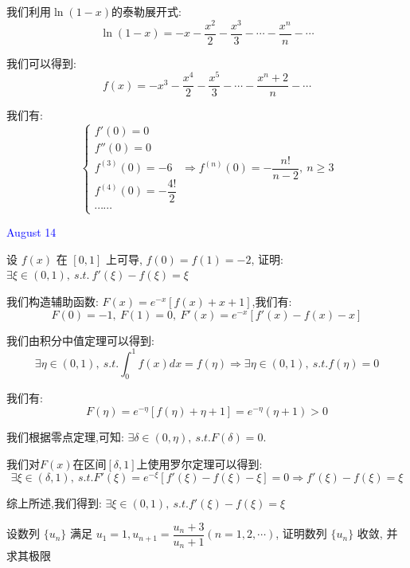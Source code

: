 \begin{solution}

	我们利用$\ln(1-x)$的泰勒展开式:  
	$$\ln(1-x)=-x-\dfrac{x^2}{2}-\dfrac{x^3}{3}-\cdots-\dfrac{x^n}{n}-\cdots$$
	
	我们可以得到:  
	$$f(x)=-x^3-\dfrac{x^4}{2}-\dfrac{x^5}{3}-\cdots-\dfrac{x^n+2}{n}-\cdots$$
	
	我们有:  
	$$\left\lbrace
	\begin{array}{l}
		f'(0)=0\\
		f''(0)=0\\
		f^{(3)}(0)=-6\\
		f^{(4)}(0)=-\dfrac{4!}{2}\\
		\cdots\cdots
	\end{array}
	\right. \Rightarrow f^{(n)}(0)=-\dfrac{n!}{n-2},\ n\geq 3$$
\end{solution}


\textcolor{blue}{August 14}

\begin{example}[][Exam: 34.2.13]
	设 $f(x)$ 在 $[0,1]$ 上可导, $f(0)=f(1)=-2$, 证明: $\exists \xi\in(0,1),\ s.t.\ f'(\xi)-f(\xi)=\xi$
\end{example}

\begin{solution}

	我们构造辅助函数:  $F(x)=e^{-x}\left[ f(x)+x+1\right]$,我们有:  
	$$F(0)=-1,\ F(1)=0,\ F'(x)=e^{-x}\left[ f'(x)-f(x)-x\right]$$
	
	我们由积分中值定理可以得到:  
	$$\exists \eta\in(0,1),\ s.t. \int_{0}^{1}f(x)dx=f(\eta)\Rightarrow \exists \eta\in(0,1),\ s.t. f(\eta)=0$$
	
	我们有:  
	$$F(\eta)=e^{-\eta}\left[ f(\eta)+\eta+1\right]=e^{-\eta}(\eta+1)>0$$
	
	我们根据零点定理,可知:  $\exists \delta\in(0,\eta),\ s.t. F(\delta)=0$.
	
	我们对$F(x)$在区间$[\delta,1]$上使用罗尔定理可以得到:  
	$$\exists\xi\in(\delta,1),\ s.t. F'(\xi)=e^{-\xi}\left[ f'(\xi)-f(\xi)-\xi\right]=0\Rightarrow f'(\xi)-f(\xi)=\xi$$
	
	综上所述,我们得到:  $\exists \xi\in(0,1),\ s.t. f'(\xi)-f(\xi)=\xi$
\end{solution}

\begin{example}[][Exam: 34.2.14]
	设数列 $\{u_{n}\}$ 满足 $u_{1}=1, u_{n+1}=\dfrac{u_{n}+3}{u_{n}+1}(n=1,2,\cdots)$, 证明数列 $\{u_{n}\}$ 收敛, 并求其极限
\end{example}

